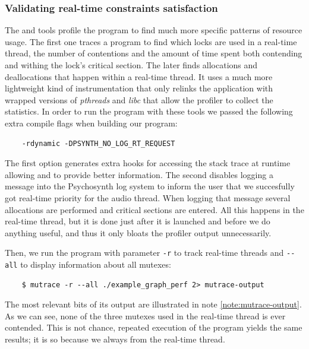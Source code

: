 \subsubsection{Validating real-time constraints satisfaction}

The  and 
tools profile the program to find much more specific patterns of
resource usage. The first one traces a program to find which locks are
used in a real-time thread, the number of contentions and the amount
of time spent both contending and withing the lock's critical
section. The later finds allocations and deallocations that happen
within a real-time thread. It uses a much more lightweight kind of
instrumentation that only relinks the application with wrapped
versions of \emph{pthreads} and \emph{libc} that allow the profiler to
collect the statistics. In order to run the program with these tools
we passed the following extra compile flags when building our program:
\begin{verbatim}
    -rdynamic -DPSYNTH_NO_LOG_RT_REQUEST
\end{verbatim}

The first option generates extra hooks for accessing the stack trace
at runtime allowing  and  to provide
better information. The second disables logging a message into the
Psychosynth log system to inform the user that we succesfully got
real-time priority for the audio thread. When logging that message
several allocations are performed and critical sections are
entered. All this happens in the real-time thread, but it is done just
after it is launched and before we do anything useful, and thus it
only bloats the profiler output unnecessarily. 

Then, we run the program with parameter \verb|-r| to track real-time
threads and \verb|--all| to display information about all mutexes:
\begin{verbatim}
    $ mutrace -r --all ./example_graph_perf 2> mutrace-output
\end{verbatim}

The most relevant bits of its output are illustrated
in note \ref{note:mutrace-output}. As we can see, none of the three
mutexes used in the real-time thread is ever contended. This is not
chance, repeated execution of the program yields the same results; it
is so because we always  from the real-time thread.

